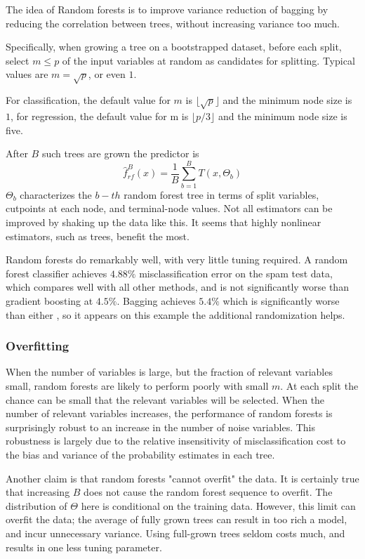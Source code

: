 The idea of Random forests is to improve variance reduction of bagging by reducing the correlation between trees, without increasing variance too much.

Specifically, when growing a tree on a bootstrapped dataset, before each split, select $m \le p$ of the input variables at random as candidates for splitting. Typical values are $m= \sqrt{p}$, or even $1$.

For classification, the default value for $m$ is $\lfloor{\sqrt{p}}\rfloor$ and the minimum node size is $1$, for regression, the default value for m is $\lfloor{p/3}\rfloor$ and the minimum node size is five.

After $B$ such trees are grown the predictor is 
\begin{equation}
\hat{f}_{rf}^B(x) = \frac{1}{B}\sum_{b=1}^BT(x, \Theta_b) 
\end{equation}
$\Theta_b$ characterizes the $b-th$ random forest tree in terms of split variables, cutpoints at each node, and terminal-node values.
Not all estimators can be improved by shaking up the data like this. It seems that highly nonlinear estimators, such as trees, benefit the most.

Random forests do remarkably well, with very little tuning required. A random forest classifier achieves $4.88\%$ misclassification error on the spam test data, which compares well with all other methods, and is not significantly worse than gradient boosting at $4.5\%$. Bagging achieves $5.4\%$ which is significantly worse than either , so it appears on this example the additional randomization helps.

\subsubsection{Overfitting}
When the number of variables is large, but the fraction of relevant variables small, random forests are likely to perform poorly with small $m$. At each split the chance can be small that the relevant variables will be selected. When the number of relevant variables increases, the performance of random forests is surprisingly robust to an increase in the number of noise variables.  This robustness is largely due to the relative insensitivity of misclassification cost to the bias and variance of the probability estimates in each tree.

Another claim is that random forests "cannot overfit" the data. It is certainly true that increasing $B$ does not cause the random forest sequence to overfit. The distribution of $\Theta$ here is conditional on the training data. However, this limit can overfit the data; the average of fully grown trees can result in too rich a model, and incur unnecessary variance. Using full-grown trees seldom costs much, and results in one less tuning parameter.

